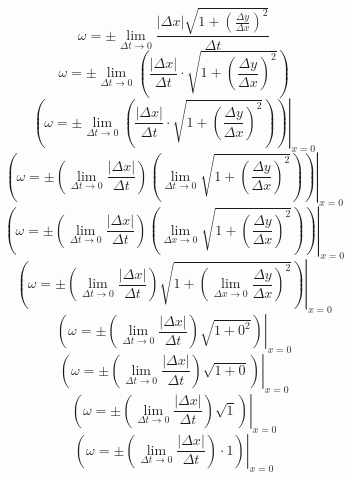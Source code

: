 \documentclass[a4paper,12pt]{report}
\begin{document}
\begin{equation}
\omega = \pm \lim \limits_{\Delta t \to 0} \frac{|\Delta x| \sqrt{1 + \left(\frac{\Delta y}{\Delta x}\right)^2}}{\Delta t}
\end{equation}
\begin{equation}
\omega = \pm \lim \limits_{\Delta t \to 0} \left(\frac{|\Delta x|}{\Delta t} \cdot \sqrt{1 + \left(\frac{\Delta y}{\Delta x}\right)^2}\right)
\end{equation}
\begin{equation}
\left.\left(\omega = \pm \lim \limits_{\Delta t \to 0} \left(\frac{|\Delta x|}{\Delta t} \cdot \sqrt{1 + \left(\frac{\Delta y}{\Delta x}\right)^2}\right)\right)\right|_{x=0}
\end{equation}
\begin{equation}
\left.\left(\omega = \pm \left(\lim \limits_{\Delta t \to 0} \frac{|\Delta x|}{\Delta t}\right) \left(\lim \limits_{\Delta t \to 0} \sqrt{1 + \left(\frac{\Delta y}{\Delta x}\right)^2}\right)\right)\right|_{x=0}
\end{equation}
\begin{equation}
\left.\left(\omega = \pm \left(\lim \limits_{\Delta t \to 0} \frac{|\Delta x|}{\Delta t}\right) \left(\lim \limits_{\Delta x \to 0} \sqrt{1 + \left(\frac{\Delta y}{\Delta x}\right)^2}\right)\right)\right|_{x=0}
\end{equation}
\begin{equation}
\left.\left(\omega = \pm \left(\lim \limits_{\Delta t \to 0} \frac{|\Delta x|}{\Delta t}\right) \sqrt{1 + \left(\lim \limits_{\Delta x \to 0} \frac{\Delta y}{\Delta x}\right)^2}\right)\right|_{x=0}
\end{equation}
\begin{equation}
\left.\left(\omega = \pm \left(\lim \limits_{\Delta t \to 0} \frac{|\Delta x|}{\Delta t}\right) \sqrt{1 + 0^2}\right)\right|_{x=0}
\end{equation}
\begin{equation}
\left.\left(\omega = \pm \left(\lim \limits_{\Delta t \to 0} \frac{|\Delta x|}{\Delta t}\right) \sqrt{1 + 0}\right)\right|_{x=0}
\end{equation}
\begin{equation}
\left.\left(\omega = \pm \left(\lim \limits_{\Delta t \to 0} \frac{|\Delta x|}{\Delta t}\right) \sqrt{1}\right)\right|_{x=0}
\end{equation}
\begin{equation}
\left.\left(\omega = \pm \left(\lim \limits_{\Delta t \to 0} \frac{|\Delta x|}{\Delta t}\right) \cdot 1\right)\right|_{x=0}
\end{equation}
\end{document}
